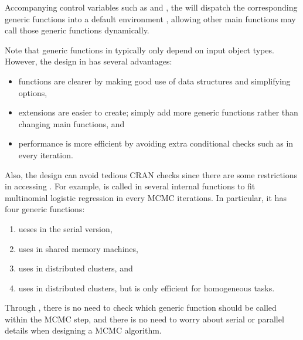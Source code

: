 Accompanying control variables such as  and ,
the  will dispatch the
corresponding generic functions into a default environment ,
allowing other main functions may call those generic functions dynamically.

Note that generic functions in  typically only depend on
input object types.  However, the design in  has 
several advantages:
\begin{itemize}
\item functions are clearer by making good use of data structures and
      simplifying options,
\item extensions are easier to create; simply add more generic functions 
      rather than changing main functions, and
\item performance is more efficient by avoiding extra
      conditional checks such as 
      in every iteration.
\end{itemize}
Also, the design can avoid tedious CRAN checks since there are some restrictions
in accessing . For example, 
 is called in several
internal functions to fit multinomial logistic regression in every MCMC
iterations. In particular, it has four generic functions:
\begin{enumerate}
\item {} ueses  in the serial version,
\item {} uses 
      in shared memory machines,
\item {} uses 
      in distributed clusters, and
\item {} uses 
      in distributed clusters, but is only efficient for homogeneous tasks.
\end{enumerate}
Through , there is no need to check which generic
function should be called within the MCMC step, and there is no need to worry
about serial or parallel details when designing a MCMC algorithm.

